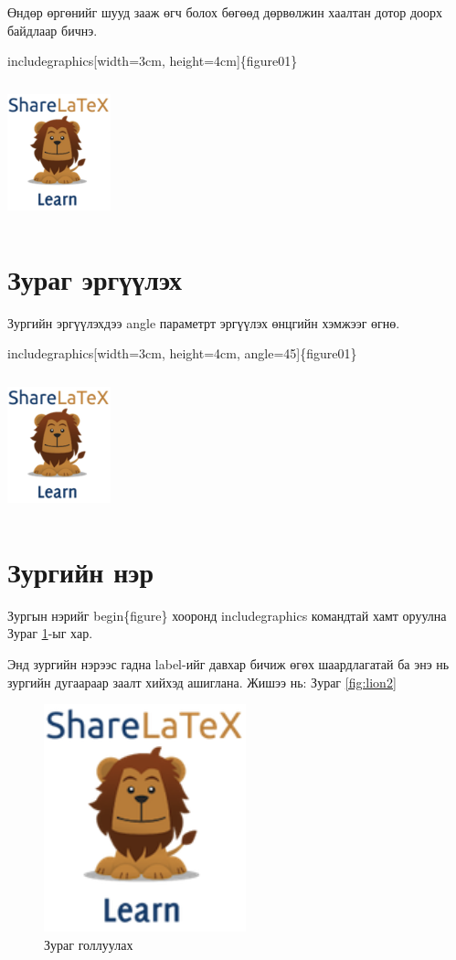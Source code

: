 \documentclass[12pt,A4]{report}
\begin{document}
Өндөр өргөнийг шууд зааж өгч болох бөгөөд дөрвөлжин хаалтан дотор доорх байдлаар бичнэ. 
\begin{center}
includegraphics[width=3cm, height=4cm]\{figure01\}
\end{center}
\includegraphics[width=3cm, height=4cm]{figure01}

\section{Зураг эргүүлэх}
Зургийн эргүүлэхдээ angle параметрт эргүүлэх өнцгийн хэмжээг өгнө. 
\begin{center}
includegraphics[width=3cm, height=4cm, angle=45]\{figure01\}
\end{center}
\includegraphics[width=3cm, height=4cm, angle=45]{figure01}

\section{Зургийн нэр}
Зургын нэрийг begin\{figure\} хооронд includegraphics командтай хамт оруулна Зураг \ref{fig:lion1}-ыг хар. 

Энд зургийн нэрээс гадна label-ийг давхар бичиж өгөх шаардлагатай ба энэ нь зургийн дугаараар заалт хийхэд ашиглана. Жишээ нь: Зураг \ref{fig:lion2}

\begin{figure}[h]
\centering
\includegraphics[scale=0.9]{figure01}
\caption{Зураг голлуулах}
\label{fig:lion1}
\end{figure}
\end{document}
